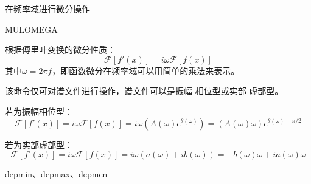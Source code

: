 \label{cmd:mulomega}

在频率域进行微分操作

\begin{SACSTX}
MULOMEGA
\end{SACSTX}

根据傅里叶变换的微分性质：
\[
\mathcal{F}[f'(x)]= i \omega \mathcal{F}[f(x)]
\]
其中$\omega = 2 \pi f $，即函数微分在频率域可以用简单的乘法来表示。

该命令仅可对谱文件进行操作，谱文件可以是振幅-相位型或实部-虚部型。

若为振幅相位型：
\[
\mathcal{F}[f'(x)]= i \omega \mathcal{F}[f(x)] = i \omega (A(\omega)e^{\theta(\omega)})
    = (A(\omega)\omega)e^{\theta(\omega)+\pi/2}
\]

若为实部虚部型：
\[
\mathcal{F}[f'(x)]= i \omega \mathcal{F}[f(x)] = i \omega (a(\omega)+ib(\omega))
    = -b(\omega)\omega+ia(\omega)\omega
\]

depmin、depmax、depmen
